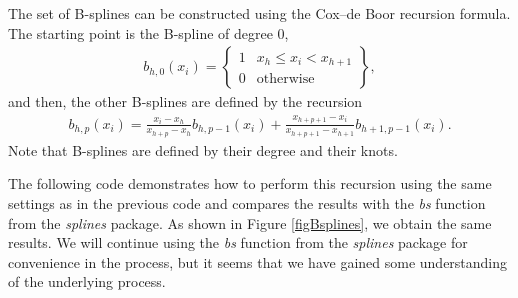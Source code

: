 The set of B-splines can be constructed using the Cox–de Boor recursion formula. The starting point is the B-spline of degree 0,
\begin{align*}
		b_{h,0}(x_i)=\begin{Bmatrix}
		1 & x_h \leq x_i < x_{h+1}\\
		0 & \text{otherwise}
	\end{Bmatrix},
\end{align*}
and then, the other B-splines are defined by the recursion
\begin{align}
	b_{h,p}(x_i)=\frac{x_i-x_{h}}{x_{h+p}-x_h}b_{h,p-1}(x_i)+\frac{x_{h+p+1}-x_i}{x_{h+p+1}-x_{h+1}}b_{h+1,p-1}(x_i).
\end{align}
Note that B-splines are defined by their degree and their knots.

The following code demonstrates how to perform this recursion using the same settings as in the previous code and compares the results with the \textit{bs} function from the \textit{splines} package. As shown in Figure \ref{figBsplines}, we obtain the same results. We will continue using the \textit{bs} function from the \textit{splines} package for convenience in the process, but it seems that we have gained some understanding of the underlying process.

